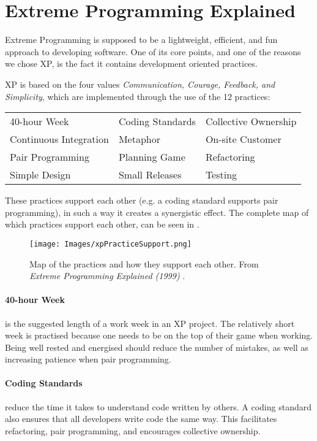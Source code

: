 \section{Extreme Programming Explained}
Extreme Programming is supposed to be a lightweight, efficient, and fun approach to developing software.
One of its core points, and one of the reasons we chose XP, is the fact it contains development oriented practices.

\noindent XP is based on the four values \textit{Communication, Courage, Feedback, and Simplicity}, which are implemented through the use of the 12 practices:

\begin{tabularx}{\textwidth}{X X X}
	40-hour Week				 & Coding Standards & Collective Ownership \\
	Continuous Integration	  & Metaphor         	 & On-site Customer     \\
	Pair Programming			& Planning Game		& Refactoring          \\
	Simple Design          		  & Small Releases   	& Testing             
\end{tabularx}

These practices support each other (e.g. a coding standard supports pair programming), in such a way it creates a synergistic effect.
The complete map of which practices support each other, can be seen in .
\begin{figure}[H]
	\centering
	\texttt{[image: Images/xpPracticeSupport.png]}
		\caption{Map of the practices and how they support each other.
			From \textit{Extreme Programming Explained (1999)} \citep[p. 70]{xp:explained}. }
	\label{fig:practiceSupport}
\end{figure}

\paragraph{40-hour Week} is the suggested length of a work week in an XP project.
The relatively short week is practised because one needs to be on the top of their game when working.
Being well rested and energised should reduce the number of mistakes, as well as increasing patience when pair programming.

\paragraph{Coding Standards} reduce the time it takes to understand code written by others.
A coding standard also ensures that all developers write code the same way.
This facilitates refactoring, pair programming, and encourages collective ownership.


